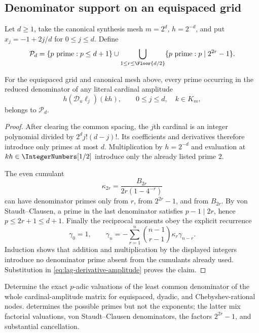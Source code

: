 \subsection{Denominator support on an equispaced grid}

Let $d\ge1$, take the canonical synthesis mesh $m=2^d$, $h=2^{-d}$, and
put $x_j=-1+2j/d$ for $0\le j\le d$.  Define
\begin{equation}
 \mathcal P_d=
 \{p\text{ prime}:p\le d+1\}
 \cup
 \bigcup_{1\le r\le\Floor{d/2}}
 \{p\text{ prime}:p\mid 2^{2r}-1\}.
 \label{eq:lag-prime-set}
\end{equation}

\begin{theorem}
\label{thm:lag-prime-support}
For the equispaced grid and canonical mesh above, every prime occurring in
the reduced denominator of any literal cardinal amplitude
\[
 h(\mathscr D_u\ell_j)(kh),
 \qquad 0\le j\le d,\quad k\in K_m,
\]
belongs to $\mathcal P_d$.
\end{theorem}

\begin{proof}
After clearing the common spacing, the $j$th cardinal is an integer polynomial
divided by $2^d j!(d-j)!$.  Its coefficients and derivatives therefore
introduce only primes at most $d$.  Multiplication by $h=2^{-d}$ and
evaluation at $kh\in\IntegerNumbers[1/2]$ introduce only the already listed prime $2$.

The even cumulant
\[
 \kappa_{2r}=\frac{B_{2r}}{2r(1-4^{-r})}
\]
can have denominator primes only from $r$, from $2^{2r}-1$, and from
$B_{2r}$.  By von Staudt--Clausen, a prime in the last denominator satisfies
$p-1\mid2r$, hence $p\le2r+1\le d+1$.  Finally the reciprocal moments obey the
explicit recurrence
\begin{equation}
 \gamma_0=1,\qquad
 \gamma_n=-\sum_{r=1}^{n}
 \binom{n-1}{r-1}\kappa_r\gamma_{n-r}.
 \label{eq:lag-reciprocal-prime-recurrence}
\end{equation}
Induction shows that addition and multiplication by the displayed integers
introduce no denominator prime absent from the cumulants already used.
Substitution in \eqref{eq:lag-derivative-amplitude} proves the claim.
\end{proof}

\begin{problem}
\label{prob:lag-denominator-valuations}
Determine the exact $p$-adic valuations of the least common denominator of
the whole cardinal-amplitude matrix for equispaced, dyadic, and
Chebyshev-rational nodes.   determines the possible
primes but not the exponents; the latter mix factorial valuations,
von Staudt--Clausen denominators, the factors $2^{2r}-1$, and substantial
cancellation.
\end{problem}
